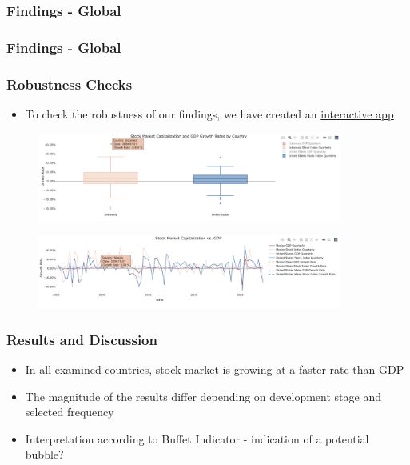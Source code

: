 \documentclass{beamer}
\begin{document}
\begin{frame}
\frametitle{Findings - Global}

\begin{figure}[htbp]
	\centering
	
	\caption{}
\end{figure}

\end{frame}

\begin{frame}
\frametitle{Findings - Global}

\begin{figure}[htbp]
	\centering
	
	\caption{}
\end{figure}

\end{frame}


\begin{frame}
\frametitle{Robustness Checks}
\begin{itemize}
    \item To check the robustness of our findings, we have created an \href{https://flurinaschneider.shinyapps.io/DTFF22/}{interactive app} 
\end{itemize}
\begin{figure}
\centering
\parbox{10cm}{
\includegraphics[width=10cm]{reports/figures/robustness_boxplots.png}
\label{fig:2figsA}}
\qquad
\begin{minipage}{10cm}
\includegraphics[width=10cm]{reports/figures/robustness_linechart.png}
\label{fig:2figsB}
\end{minipage}
\end{figure}
\end{frame}


\begin{frame}
\frametitle{Results and Discussion}
\begin{itemize}
\item In all examined countries, stock market is growing at a faster rate than GDP
\item The magnitude of the results differ depending on development stage and selected frequency
\item Interpretation according to Buffet Indicator - indication of a potential bubble?
\end{itemize}
\end{frame}
\end{document}
